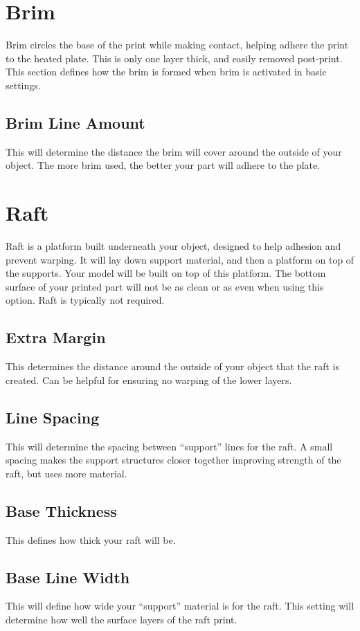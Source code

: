 \section{Brim}
Brim circles the base of the print while making contact, helping adhere the print to the heated plate. This is only one layer thick, and easily removed post-print. This section defines how the brim is formed when brim is activated in basic settings.

\subsection{Brim Line Amount}
This will determine the distance the brim will cover around the outside of your object. The more brim used, the better your part will adhere to the plate. 

\section{Raft}
Raft is a platform built underneath your object, designed to help adhesion and prevent warping. It will lay down support material, and then a platform on top of the supports. Your model will be built on top of this platform. The bottom surface of your printed part will not be as clean or as even when using this option. Raft is typically not required.

\subsection{Extra Margin}
This determines the distance around the outside of your object that the raft is created. Can be helpful for ensuring no warping of the lower layers.

\subsection{Line Spacing}
This will determine the spacing between “support” lines for the raft. A small spacing makes the support structures closer together improving strength of the raft, but uses more material.

\subsection{Base Thickness}
This defines how thick your raft will be.

\subsection{Base Line Width}
This will define how wide your “support” material is for the raft. This setting will determine how well the surface layers of the raft print.


